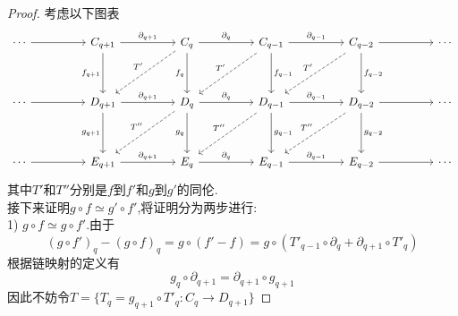 \documentclass{article}
\begin{document}
\begin{proof}
    考虑以下图表
    \[\begin{tikzcd}
        \cdots && {C_{q+1}} && {C_q} && {C_{q-1}} && {C_{q-2}} && \cdots \\
        \\
        \cdots && {D_{q+1}} && {D_q} && {D_{q-1}} && {D_{q-2}} && \cdots \\
        \\
        \cdots && {E_{q+1}} && {E_q} && {E_{q-1}} && {E_{q-2}} && \cdots
        \arrow[from=1-1, to=1-3]
        \arrow["{\partial_{q+1}}", from=1-3, to=1-5]
        \arrow["{\partial_q}", from=1-5, to=1-7]
        \arrow["{\partial_{q-1}}", from=1-7, to=1-9]
        \arrow[from=1-9, to=1-11]
        \arrow[from=3-1, to=3-3]
        \arrow["{\partial_{q+1}}", from=3-3, to=3-5]
        \arrow["{\partial_q}", from=3-5, to=3-7]
        \arrow["{\partial_{q-1}}", from=3-7, to=3-9]
        \arrow[from=3-9, to=3-11]
        \arrow["{f_{q+1}}"', from=1-3, to=3-3]
        \arrow["{f_q}"', from=1-5, to=3-5]
        \arrow["{f_{q-1}}", from=1-7, to=3-7]
        \arrow["{f_{q-2}}", from=1-9, to=3-9]
        \arrow[from=5-1, to=5-3]
        \arrow["{g_{q+1}}"', from=3-3, to=5-3]
        \arrow["{g_q}"', from=3-5, to=5-5]
        \arrow["{\partial_{q+1}}", from=5-3, to=5-5]
        \arrow["{\partial_{q}}", from=5-5, to=5-7]
        \arrow["{\partial_{q-1}}", from=5-7, to=5-9]
        \arrow["{g_{q-2}}", from=3-9, to=5-9]
        \arrow[from=5-9, to=5-11]
        \arrow["{T'}"', dashed, from=1-5, to=3-3]
        \arrow["{T''}"', dashed, from=3-5, to=5-3]
        \arrow["{T'}"', dashed, from=1-7, to=3-5]
        \arrow["{T'}"', dashed, from=1-9, to=3-7]
        \arrow["{g_{q-1}}", from=3-7, to=5-7]
        \arrow["{T''}"', dashed, from=3-7, to=5-5]
        \arrow["{T''}"', dashed, from=3-9, to=5-7]
    \end{tikzcd}\]
    其中$T'$和$T''$分别是$f$到$f'$和$g$到$g'$的同伦.\\
    接下来证明$g \circ f \simeq g' \circ f'$,将证明分为两步进行:\\
    1) $g \circ f \simeq g \circ f'$.由于
    \begin{equation}
        (g \circ f')_q - (g \circ f)_q = g \circ (f' - f) = g \circ (T'_{q-1} \circ \partial_q + \partial_{q+1}\circ T'_q)
        \tag{1}
        \label{equ:3.1.7.1}
    \end{equation}
    根据链映射的定义有
    $$
    g_q\circ\partial_{q+1} = \partial_{q+1}\circ g_{q+1}
    $$
    因此不妨令$T = \{ T_q = g_{q+1} \circ T'_{q}: C_q \to D_{q+1}\}$

\end{proof}
\end{document}
